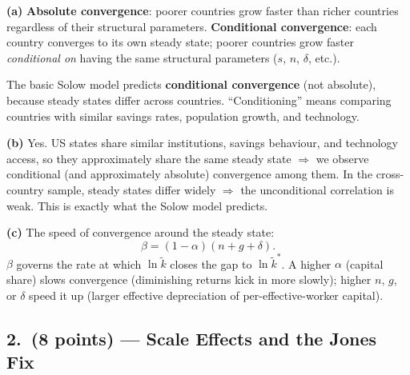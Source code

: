 \documentclass[a4paper,11pt]{article}
\newcommand{\ktilde}{\tilde{k}}
\begin{document}
\begin{answerbox}
\textbf{(a)} \textbf{Absolute convergence}: poorer countries grow faster than richer
countries regardless of their structural parameters.
\textbf{Conditional convergence}: each country converges to its own steady state; poorer
countries grow faster \emph{conditional on} having the same structural parameters
($s$, $n$, $\delta$, etc.).

The basic Solow model predicts \textbf{conditional convergence} (not absolute), because
steady states differ across countries.  ``Conditioning'' means comparing countries with
similar savings rates, population growth, and technology.

\textbf{(b)} Yes.  US states share similar institutions, savings behaviour, and technology
access, so they approximately share the same steady state $\Rightarrow$ we observe
conditional (and approximately absolute) convergence among them.  In the cross-country
sample, steady states differ widely $\Rightarrow$ the unconditional correlation is weak.
This is exactly what the Solow model predicts.

\textbf{(c)} The speed of convergence around the steady state:
\[
    \beta = (1-\alpha)(n + g + \delta).
\]
$\beta$ governs the rate at which $\ln\ktilde$ closes the gap to $\ln\ktilde^*$.
A higher $\alpha$ (capital share) slows convergence (diminishing returns kick in more
slowly); higher $n$, $g$, or $\delta$ speed it up (larger effective depreciation of
per-effective-worker capital).
\end{answerbox}

\subsection*{2.\ (8 points) --- Scale Effects and the Jones Fix}
\end{document}
